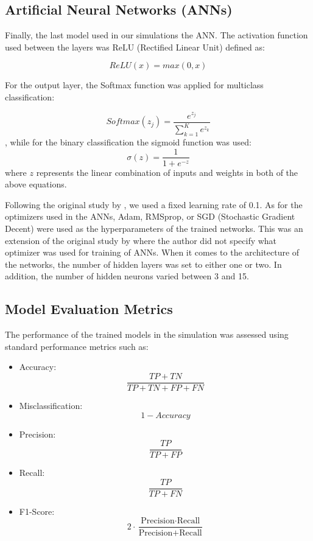 \documentclass[12pt]{article}
\begin{document}
\subsection{Artificial Neural Networks (ANNs)}

Finally, the last model used in our simulations the ANN. 
The activation function used between the layers was ReLU (Rectified Linear Unit) defined as:

\[
ReLU(x) = max(0,x)
\]

For the output layer, the Softmax function was applied for multiclass classification:

\[
Softmax(z_j) = \frac{e^{z_j}}{\sum_{k=1}^{K}e^{z_k}}
\]
, while for the binary classification the sigmoid function was used: 
\[
\sigma(z) = \frac{1}{1 + e^{-z}}
\]
where \( z \) represents the linear combination of inputs and weights in both of the above equations.

Following the original study by \cite{kim:10}, we used a fixed learning rate of 0.1.
As for the optimizers used in the ANNs, Adam, RMSprop, or SGD (Stochastic Gradient Decent) were used as the hyperparameters of the trained networks. This was an extension of the original study by \cite{kim:10} where the author did not specify what optimizer was used for training of ANNs.
When it comes to the architecture of the networks, the number of hidden layers was set to either one or two. In addition, the number of hidden neurons varied between 3 and 15.

\subsection{Model Evaluation Metrics}

The performance of the trained models in the simulation was assessed using standard performance metrics such as:

\begin{itemize}
\item Accuracy: 
\[
\frac{TP + TN}{TP + TN + FP + FN}
\]
\item Misclassification:
\[
1 - Accuracy
\]

\item Precision:
\[
\frac{TP}{TP + FP}
\]

\item Recall:
\[
\frac{TP}{TP + FN}
\]

\item F1-Score:
\[
2 \cdot \frac{\text{Precision}\cdot\text{Recall}}{\text{Precision} + \text{Recall}}
\]
\end{itemize}
\end{document}
